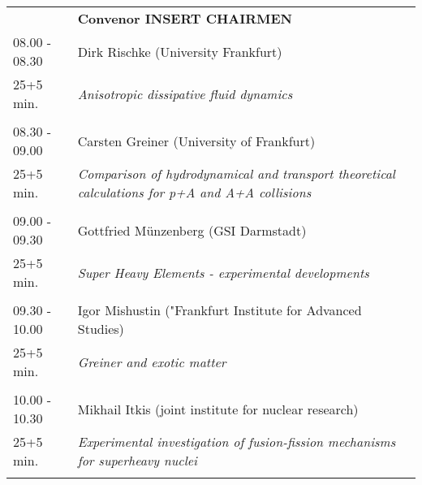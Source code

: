 \begin{longtable}{p{3cm}p{13cm}}
&\hfill {\bf Convenor INSERT CHAIRMEN }\\ 
08.00 - 08.30 & Dirk Rischke (University Frankfurt)\\ 
25+5 min. & {\it Anisotropic dissipative fluid dynamics}\\ 
 & \\ 
08.30 - 09.00 & Carsten Greiner (University of Frankfurt)\\ 
25+5 min. & {\it Comparison of hydrodynamical and transport theoretical calculations for p+A and A+A collisions}\\ 
 & \\ 
09.00 - 09.30 & Gottfried Münzenberg (GSI Darmstadt)\\ 
25+5 min. & {\it Super Heavy Elements -  experimental developments}\\ 
 & \\ 
09.30 - 10.00 & Igor Mishustin ("Frankfurt Institute for Advanced Studies)\\ 
25+5 min. & {\it Greiner and exotic matter}\\ 
 & \\ 
10.00 - 10.30 & Mikhail Itkis (joint institute for nuclear research)\\ 
25+5 min. & {\it Experimental investigation of fusion-fission mechanisms for superheavy nuclei}\\ 
 & \\ 
\end{longtable}

